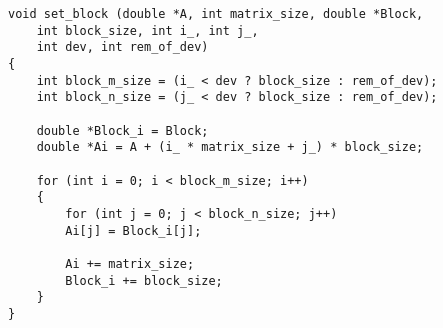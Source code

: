 \documentclass[a4paper, fontsize=14pt]{article}
\begin{document}
		\begin{lstlisting}
void set_block (double *A, int matrix_size, double *Block,
	int block_size, int i_, int j_,
	int dev, int rem_of_dev)
{
	int block_m_size = (i_ < dev ? block_size : rem_of_dev);
	int block_n_size = (j_ < dev ? block_size : rem_of_dev);
	
	double *Block_i = Block;
	double *Ai = A + (i_ * matrix_size + j_) * block_size;
	
	for (int i = 0; i < block_m_size; i++)
	{
		for (int j = 0; j < block_n_size; j++)
		Ai[j] = Block_i[j];
		
		Ai += matrix_size;
		Block_i += block_size;
	}
}
		\end{lstlisting}
		
\end{document}
